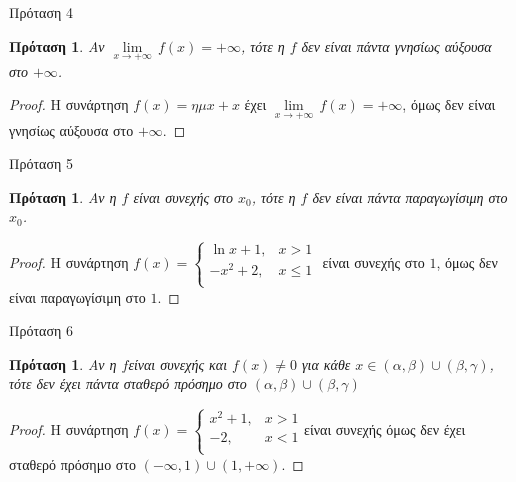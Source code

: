 \documentclass[greek]{beamer}
\newtheorem{proposition}[theorem]{Πρόταση}
\begin{document}
\begin{frame}{Πρόταση 4}
 \begin{proposition}
  \normalfont Αν $\underset{x\to +\infty }{\mathop{\lim }}\,f\left( x \right)=+\infty $, τότε η $f$ δεν είναι πάντα γνησίως αύξουσα στο $+\infty $.
 \end{proposition}
 \begin{proof}
  Η συνάρτηση $f\left( x \right)=\eta \mu x+x$ έχει $\underset{x\to +\infty }{\mathop{\lim }}\,f\left( x \right)=+\infty $, όμως δεν είναι γνησίως αύξουσα στο $+\infty $.
 \end{proof}
\end{frame}

\begin{frame}{Πρόταση 5}
 \begin{proposition}
  \normalfont Αν η $f$ είναι συνεχής στο ${{x}_{0}}$, τότε η $f$ δεν είναι πάντα παραγωγίσιμη στο ${{x}_{0}}$.
 \end{proposition}
 \begin{proof}
  Η συνάρτηση $f\left( x \right)=\left\{ \begin{array}{*{35}{l}}
    \ln x+1,      & x>1    \\
    -{{x}^{2}}+2, & x\le 1 \\
   \end{array} \right.$ είναι συνεχής στο $1$, όμως δεν είναι παραγωγίσιμη στο $1$.
 \end{proof}
\end{frame}

\begin{frame}{Πρόταση 6}
 \begin{proposition}
  \normalfont Αν η $f$είναι συνεχής και $f(x)\ne 0$ για κάθε $x\in (\alpha ,\beta )\cup (\beta ,\gamma )$, τότε δεν έχει πάντα σταθερό πρόσημο στο  $(\alpha ,\beta )\cup (\beta ,\gamma )$
 \end{proposition}
 \begin{proof}
  Η συνάρτηση $f\left( x \right)=\left\{ \begin{array}{*{35}{l}}
    {{x}^{2}}+1, & x>1 \\
    -2,          & x<1 \\
   \end{array} \right.$είναι συνεχής όμως δεν έχει σταθερό πρόσημο στο $(-\infty ,1)\cup (1,+\infty )$.

 \end{proof}
\end{frame}
\end{document}
